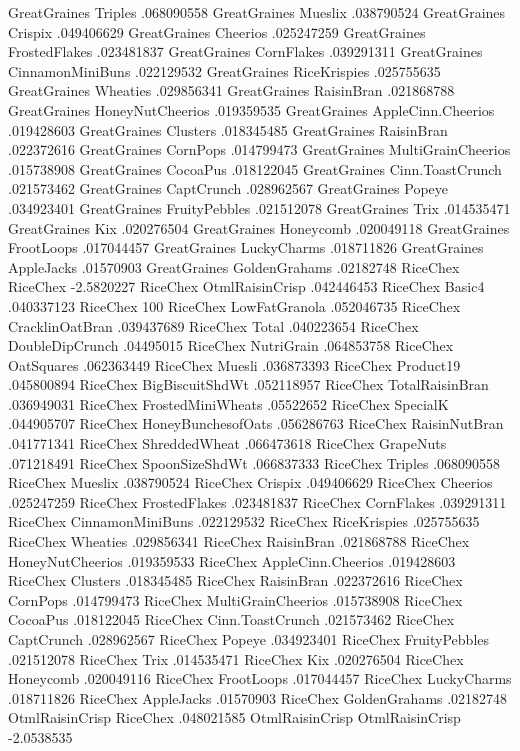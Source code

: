 GreatGraines	Triples	.068090558
GreatGraines	Mueslix	.038790524
GreatGraines	Crispix	.049406629
GreatGraines	Cheerios	.025247259
GreatGraines	FrostedFlakes	.023481837
GreatGraines	CornFlakes	.039291311
GreatGraines	CinnamonMiniBuns	.022129532
GreatGraines	RiceKrispies	.025755635
GreatGraines	Wheaties	.029856341
GreatGraines	RaisinBran	.021868788
GreatGraines	HoneyNutCheerios	.019359535
GreatGraines	AppleCinn.Cheerios	.019428603
GreatGraines	Clusters	.018345485
GreatGraines	RaisinBran	.022372616
GreatGraines	CornPops	.014799473
GreatGraines	MultiGrainCheerios	.015738908
GreatGraines	CocoaPus	.018122045
GreatGraines	Cinn.ToastCrunch	.021573462
GreatGraines	CaptCrunch	.028962567
GreatGraines	Popeye	.034923401
GreatGraines	FruityPebbles	.021512078
GreatGraines	Trix	.014535471
GreatGraines	Kix	.020276504
GreatGraines	Honeycomb	.020049118
GreatGraines	FrootLoops	.017044457
GreatGraines	LuckyCharms	.018711826
GreatGraines	AppleJacks	.01570903
GreatGraines	GoldenGrahams	.02182748
RiceChex	RiceChex	-2.5820227
RiceChex	OtmlRaisinCrisp	.042446453
RiceChex	Basic4	.040337123
RiceChex	100%
RiceChex	LowFatGranola	.052046735
RiceChex	CracklinOatBran	.039437689
RiceChex	Total	.040223654
RiceChex	DoubleDipCrunch	.04495015
RiceChex	NutriGrain	.064853758
RiceChex	OatSquares	.062363449
RiceChex	Muesli	.036873393
RiceChex	Product19	.045800894
RiceChex	BigBiscuitShdWt	.052118957
RiceChex	TotalRaisinBran	.036949031
RiceChex	FrostedMiniWheats	.05522652
RiceChex	SpecialK	.044905707
RiceChex	HoneyBunchesofOats	.056286763
RiceChex	RaisinNutBran	.041771341
RiceChex	ShreddedWheat	.066473618
RiceChex	GrapeNuts	.071218491
RiceChex	SpoonSizeShdWt	.066837333
RiceChex	Triples	.068090558
RiceChex	Mueslix	.038790524
RiceChex	Crispix	.049406629
RiceChex	Cheerios	.025247259
RiceChex	FrostedFlakes	.023481837
RiceChex	CornFlakes	.039291311
RiceChex	CinnamonMiniBuns	.022129532
RiceChex	RiceKrispies	.025755635
RiceChex	Wheaties	.029856341
RiceChex	RaisinBran	.021868788
RiceChex	HoneyNutCheerios	.019359533
RiceChex	AppleCinn.Cheerios	.019428603
RiceChex	Clusters	.018345485
RiceChex	RaisinBran	.022372616
RiceChex	CornPops	.014799473
RiceChex	MultiGrainCheerios	.015738908
RiceChex	CocoaPus	.018122045
RiceChex	Cinn.ToastCrunch	.021573462
RiceChex	CaptCrunch	.028962567
RiceChex	Popeye	.034923401
RiceChex	FruityPebbles	.021512078
RiceChex	Trix	.014535471
RiceChex	Kix	.020276504
RiceChex	Honeycomb	.020049116
RiceChex	FrootLoops	.017044457
RiceChex	LuckyCharms	.018711826
RiceChex	AppleJacks	.01570903
RiceChex	GoldenGrahams	.02182748
OtmlRaisinCrisp	RiceChex	.048021585
OtmlRaisinCrisp	OtmlRaisinCrisp	-2.0538535
